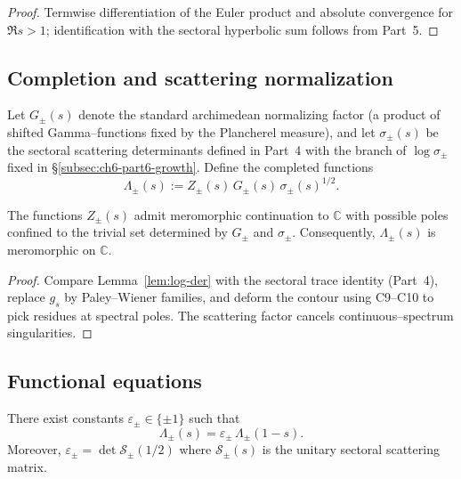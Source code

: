 \begin{proof}
Termwise differentiation of the Euler product and absolute convergence for $\Re s>1$; identification with the sectoral hyperbolic sum follows from Part~5.  %
\end{proof}


\subsection{Completion and scattering normalization}
\label{subsec:ch6-part7-completion} \relax \hspace{0pt}
Let $G_\pm(s)$ denote the standard archimedean normalizing factor (a product of shifted Gamma–functions fixed by the Plancherel measure), and let $\sigma_\pm(s)$ be the sectoral scattering determinants defined in Part~4 with the branch of $\log\sigma_\pm$ fixed in \S\ref{subsec:ch6-part6-growth}. Define the completed functions
\[
\Lambda_\pm(s):= Z_\pm(s)\,G_\pm(s)\,\sigma_\pm(s)^{1/2}.
\]

\begin{theorem}
\label{thm:ancont}
The functions $Z_\pm(s)$ admit meromorphic continuation to $\mathbb C$ with possible poles confined to the trivial set determined by $G_\pm$ and $\sigma_\pm$. Consequently, $\Lambda_\pm(s)$ is meromorphic on $\mathbb C$.  %
\end{theorem}

\begin{proof}
Compare Lemma~\ref{lem:log-der} with the sectoral trace identity (Part~4), replace $g_s$ by Paley–Wiener families, and deform the contour using C9–C10 to pick residues at spectral poles. The scattering factor cancels continuous–spectrum singularities.  %
\end{proof}


\subsection{Functional equations}
\label{subsec:ch6-part7-fe} \relax \hspace{0pt}
\begin{theorem}
\label{thm:fe}
There exist constants $\varepsilon_\pm\in\{\pm 1\}$ such that
\[
\Lambda_\pm(s)=\varepsilon_\pm\,\Lambda_\pm(1-s).
\]
Moreover, $\varepsilon_\pm=\det \mathcal S_\pm(1/2)$ where $\mathcal S_\pm(s)$ is the unitary sectoral scattering matrix.  %
\end{theorem}

